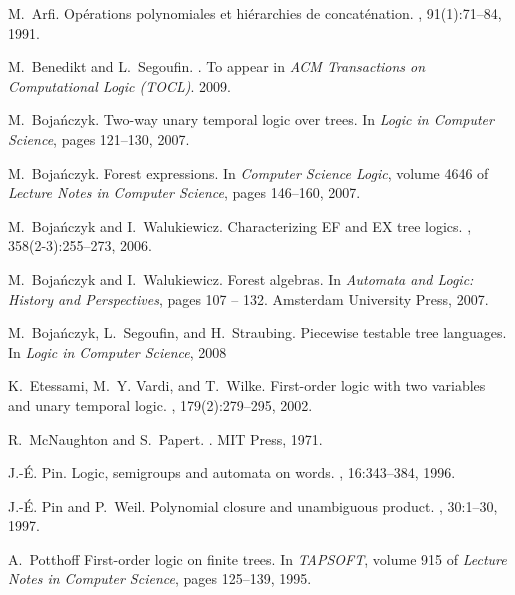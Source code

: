\documentclass{LMCS}
\begin{document}
\begin{thebibliography}{10}
M.~Arfi.
\newblock Op{\'e}rations polynomiales et hi{\'e}rarchies de concat{\'e}nation.
, 91(1):71--84, 1991.

M.~Benedikt and L.~Segoufin.
.
\newblock To appear in {\em ACM Transactions on Computational Logic
  (TOCL)}. 2009.



M.~Boja\'nczyk.
\newblock Two-way unary temporal logic over trees.
\newblock In {\em Logic in Computer Science}, pages 121--130, 2007.

M.~Boja\'nczyk.
\newblock Forest expressions.
\newblock In {\em Computer Science Logic}, volume 4646 of {\em Lecture Notes in
  Computer Science}, pages 146--160, 2007.

M.~Boja\'nczyk and I.~Walukiewicz.
\newblock Characterizing {EF} and {EX} tree logics.
, 358(2-3):255--273, 2006.

M.~Boja\'nczyk and I.~Walukiewicz.
\newblock Forest algebras.
\newblock In {\em Automata and Logic: History and Perspectives}, pages 107 --
  132. Amsterdam University Press, 2007.

M.~Boja\'nczyk,  L.~Segoufin, and H.~Straubing.
\newblock Piecewise testable tree languages.
\newblock In {\em Logic in Computer Science}, 2008

K.~Etessami, M.~Y. Vardi, and T.~Wilke.
\newblock First-order logic with two variables and unary temporal logic.
, 179(2):279--295, 2002.


R.~McNaughton and S.~Papert.
.
\newblock MIT Press, 1971.

J.-\'E. Pin.
\newblock Logic, semigroups and automata on words.
, 16:343--384,
  1996.

J.-\'E. Pin and P.~Weil.
\newblock Polynomial closure and unambiguous product.
, 30:1--30, 1997.

A.~Potthoff
\newblock First-order logic on finite trees.
\newblock In {\em TAPSOFT}, volume 915 of {\em Lecture Notes in
  Computer Science}, pages 125--139, 1995.



\end{thebibliography}
\end{document}
